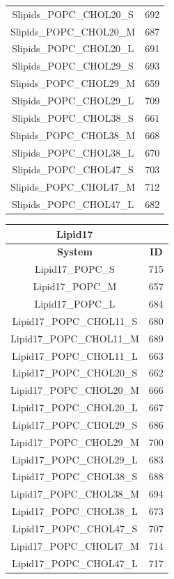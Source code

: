 \documentclass[journal=jpcbfk,manuscript=suppinfo]{achemso}
\begin{document}
\begin{table}[]
\begin{small}
\begin{tabular}{cc}
\midrule
Slipids\_POPC\_CHOL20\_S  &  692 \\ 
Slipids\_POPC\_CHOL20\_M  &  687 \\ 
Slipids\_POPC\_CHOL20\_L  &  691 \\ 
\midrule
Slipids\_POPC\_CHOL29\_S  &  693 \\ 
Slipids\_POPC\_CHOL29\_M  &  659 \\ 
Slipids\_POPC\_CHOL29\_L  &  709 \\ 
\midrule
Slipids\_POPC\_CHOL38\_S  &  661 \\ 
Slipids\_POPC\_CHOL38\_M  &  668 \\ 
Slipids\_POPC\_CHOL38\_L  &  670 \\ 
\midrule
Slipids\_POPC\_CHOL47\_S  &  703 \\ 
Slipids\_POPC\_CHOL47\_M  &  712 \\ 
Slipids\_POPC\_CHOL47\_L  &  682 \\
\bottomrule
\end{tabular}
\quad
\begin{tabular}{cc}
\textbf{Lipid17} \\
\toprule
\textbf{System} & \textbf{ID} \\
\midrule
Lipid17\_POPC\_S  &  715 \\ 
Lipid17\_POPC\_M  &  657 \\ 
Lipid17\_POPC\_L  &  684 \\ 
\midrule
Lipid17\_POPC\_CHOL11\_S  &  680 \\ 
Lipid17\_POPC\_CHOL11\_M  &  689 \\
Lipid17\_POPC\_CHOL11\_L  &  663 \\ 
\midrule
Lipid17\_POPC\_CHOL20\_S  &  662 \\ 
Lipid17\_POPC\_CHOL20\_M  &  666 \\ 
Lipid17\_POPC\_CHOL20\_L  &  667 \\ 
\midrule
Lipid17\_POPC\_CHOL29\_S  &  686 \\ 
Lipid17\_POPC\_CHOL29\_M  &  700 \\ 
Lipid17\_POPC\_CHOL29\_L  &  683 \\ 
\midrule
Lipid17\_POPC\_CHOL38\_S  &  688 \\ 
Lipid17\_POPC\_CHOL38\_M  &  694 \\ 
Lipid17\_POPC\_CHOL38\_L  &  673 \\ 
\midrule
Lipid17\_POPC\_CHOL47\_S  &  707 \\ 
Lipid17\_POPC\_CHOL47\_M  &  714 \\ 
Lipid17\_POPC\_CHOL47\_L  &  717 \\ 

\end{tabular}
\end{small}
\end{table}
\end{document}
